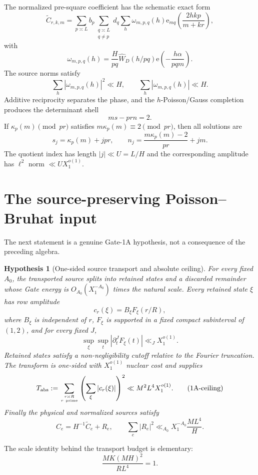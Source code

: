 \documentclass[11pt]{article}
\newtheorem{hypothesis}[theorem]{Hypothesis}
\theoremstyle{definition}
\theoremstyle{remark}
\newcommand{\e}{\mathrm{e}}
\newcommand{\1}{\mathbf 1}
\begin{document}
The normalized pre-square coefficient has the schematic exact form
\[
 \widetilde C_{r,k,m}=
 \sum_{p\asymp L}b_p\sum_{\substack{q\asymp L\\q\ne p}}d_q
 \sum_h\omega_{m,p,q}(h)
 \e_{mq}\!\left(\frac{2hkp}{m+kr}\right),
\]
with
\[
 \omega_{m,p,q}(h)=\frac{H}{pq}\widehat W_D(h/pq)
 \e\!\left(-\frac{h\alpha}{pqm}\right).
\tag{1A-omega}
\]
The source norms satisfy
\[
 \sum_h|\omega_{m,p,q}(h)|^2\ll H,
 \qquad
 \sum_h|\omega_{m,p,q}(h)|\ll H.
\]
Additive reciprocity separates the phase, and the $h$-Poisson/Gauss completion produces the determinant shell
\[
 \boxed{ms-prn=2.}
\tag{1A-shell}
\]
If $\kappa_p(m)\pmod{pr}$ satisfies $m\kappa_p(m)\equiv2\pmod{pr}$, then all solutions are
\[
 s_j=\kappa_p(m)+jpr,
 \qquad
 n_j=\frac{m\kappa_p(m)-2}{pr}+jm.
\]
The quotient index has length $|j|\ll U=L/H$ and the corresponding amplitude has $\ell^2$ norm $\ll UX_1^{o(1)}$.

\section{The source-preserving Poisson--Bruhat input}

The next statement is a genuine Gate-1A hypothesis, not a consequence of the preceding algebra.

\begin{hypothesis}[One-sided source transport and absolute ceiling]\label{hyp:PB}
For every fixed $A_0$, the transported source splits into retained states and a discarded remainder whose Gate
energy is $O_{A_0}(X_1^{-A_0})$ times the natural scale.  Every retained state $\xi$ has row amplitude
\[
 \boxed{c_r(\xi)=B_\xi F_\xi(r/R),}
\tag{1A-PB}
\]
where $B_\xi$ is independent of $r$, $F_\xi$ is supported in a fixed compact subinterval of $(1,2)$, and for
every fixed $J$,
\[
 \sup_\xi\sup_t|\partial_t^JF_\xi(t)|\ll_JX_1^{o(1)}.
\]
Retained states satisfy a non-negligibility cutoff relative to the Fourier truncation.  The transform is one-sided
with $X_1^{o(1)}$ nuclear cost and supplies
\[
 T_{\rm abs}:=\sum_{r\asymp R\atop r\ \rm prime}
 \left(\sum_\xi|c_r(\xi)|\right)^2
 \ll M^2L^4X_1^{o(1)}.
\tag{1A-ceiling}
\]
Finally the physical and normalized sources satisfy
\[
 C_e=H^{-1}\widetilde C_e+R_e,
 \qquad
 \sum_e|R_e|^2\ll_{A_0}X_1^{-A_0}\frac{ML^4}{H}.
\tag{1A-bridge}
\]
\end{hypothesis}

The scale identity behind the transport budget is elementary:
\[
 \frac{MK(MH)^2}{RL^4}=1.
\tag{1A-budget}
\]
\end{document}
